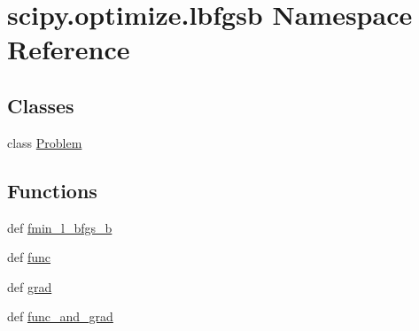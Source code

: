 \hypertarget{namespacescipy_1_1optimize_1_1lbfgsb}{}\section{scipy.\+optimize.\+lbfgsb Namespace Reference}
\label{namespacescipy_1_1optimize_1_1lbfgsb}
\subsection*{Classes}
\begin{DoxyCompactItemize}
\item 
class \hyperlink{classscipy_1_1optimize_1_1lbfgsb_1_1Problem}{Problem}
\end{DoxyCompactItemize}
\subsection*{Functions}
\begin{DoxyCompactItemize}
\item 
def \hyperlink{namespacescipy_1_1optimize_1_1lbfgsb_aef8d649e45fd180967818ac9e8c35c5c}{fmin\+\_\+l\+\_\+bfgs\+\_\+b}
\item 
def \hyperlink{namespacescipy_1_1optimize_1_1lbfgsb_ae21716be2dad2cdae7603f0a23c13bca}{func}
\item 
def \hyperlink{namespacescipy_1_1optimize_1_1lbfgsb_affe172e589223f0a3ff1f48c9e78b6f9}{grad}
\item 
def \hyperlink{namespacescipy_1_1optimize_1_1lbfgsb_a8cf70b9a52fb0f183083cc06225ce2e9}{func\+\_\+and\+\_\+grad}
\end{DoxyCompactItemize}
